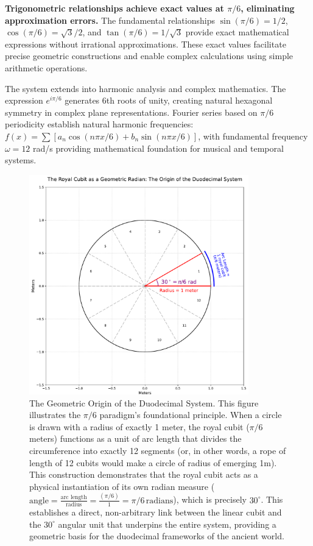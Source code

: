 \documentclass[11pt]{article}
\begin{document}
\textbf{Trigonometric relationships achieve exact values at $\pi/6$, eliminating approximation errors.} The fundamental relationships $\sin(\pi/6) = 1/2$, $\cos(\pi/6) = \sqrt{3}/2$, and $\tan(\pi/6) = 1/\sqrt{3}$ provide exact mathematical expressions without irrational approximations. These exact values facilitate precise geometric constructions and enable complex calculations using simple arithmetic operations.

The system extends into harmonic analysis and complex mathematics. The expression $e^{i\pi/6}$ generates 6th roots of unity, creating natural hexagonal symmetry in complex plane representations. Fourier series based on $\pi/6$ periodicity establish natural harmonic frequencies: $f(x) = \sum[a_n\cos(n\pi x/6) + b_n\sin(n\pi x/6)]$, with fundamental frequency $\omega = 12$ rad/s providing mathematical foundation for musical and temporal systems.

\begin{figure}[htbp]
\centering
\includegraphics[width=0.85\textwidth]{figures/radian.pdf}
\caption{The Geometric Origin of the Duodecimal System. This figure illustrates the $\pi/6$ paradigm's foundational principle. When a circle is drawn with a radius of exactly 1 meter, the royal cubit ($\pi/6$ meters) functions as a unit of arc length that divides the circumference into exactly 12 segments (or, in other words, a rope of length of 12 cubits would make a circle of radius of emerging 1m). This construction demonstrates that the royal cubit acts as a physical instantiation of its own radian measure ($\text{angle} = \frac{\text{arc length}}{\text{radius}} = \frac{(\pi/6)}{1} = \pi/6\,\text{radians}$), which is precisely $30^\circ$. This establishes a direct, non-arbitrary link between the linear cubit and the $30^\circ$ angular unit that underpins the entire system, providing a geometric basis for the duodecimal frameworks of the ancient world.}
\label{fig:radian_origin}
\end{figure}
\end{document}

